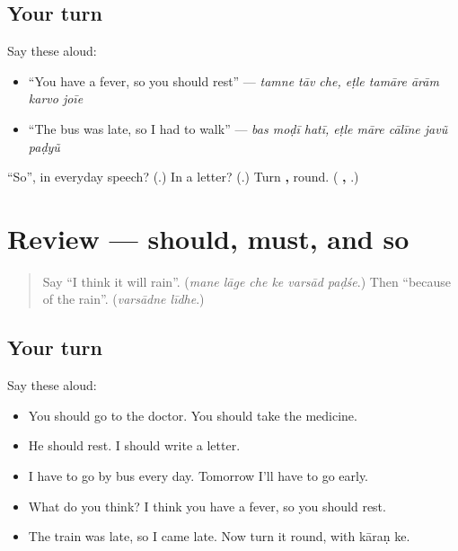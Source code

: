 \subsection*{Your turn}
Say these aloud:

\begin{itemize}
\raggedright
  \item \textquotedblleft{}You have a fever, so you should rest\textquotedblright{} — \emph{tamne tāv che, eṭle tamāre ārām karvo joīe}
  \item \textquotedblleft{}The bus was late, so I had to walk\textquotedblright{} — \emph{bas moḍī hatī, eṭle māre cālīne javũ paḍyũ}
\end{itemize}

\begin{tcolorbox}[breakable,colback=teal!4,colframe=teal!35!black,title={Before you move on}]
\textquotedblleft{}So\textquotedblright{}, in everyday speech? (\textbf{}.) In a letter? (\textbf{}.) Turn \textbf{  ,     } round. (\textbf{  ,    }.)
\end{tcolorbox}
\section[(review)]{Review — should, must, and so}

\label{lesson:GU-R278-advice-and-result}



\begin{quote}
Say \textquotedblleft{}I think it will rain\textquotedblright{}. (\emph{mane lāge che ke varsād paḍśe}.) Then \textquotedblleft{}because of the rain\textquotedblright{}. (\emph{varsādne līdhe}.)
\end{quote}

\subsection*{Your turn}
Say these aloud:

\begin{itemize}
\raggedright
  \item You should go to the doctor. You should take the medicine.
  \item He should rest. I should write a letter.
  \item I have to go by bus every day. Tomorrow I'll have to go early.
  \item What do you think? I think you have a fever, so you should rest.
  \item The train was late, so I came late. Now turn it round, with kāraṇ ke.
\end{itemize}

